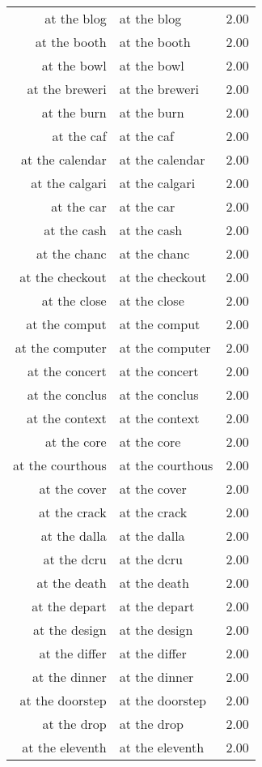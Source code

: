 \begin{table}[ht]
\begin{tabular}{rlr}
  at the blog & at the blog & 2.00 \\ 
  at the booth & at the booth & 2.00 \\ 
  at the bowl & at the bowl & 2.00 \\ 
  at the breweri & at the breweri & 2.00 \\ 
  at the burn & at the burn & 2.00 \\ 
  at the caf & at the caf & 2.00 \\ 
  at the calendar & at the calendar & 2.00 \\ 
  at the calgari & at the calgari & 2.00 \\ 
  at the car & at the car & 2.00 \\ 
  at the cash & at the cash & 2.00 \\ 
  at the chanc & at the chanc & 2.00 \\ 
  at the checkout & at the checkout & 2.00 \\ 
  at the close & at the close & 2.00 \\ 
  at the comput & at the comput & 2.00 \\ 
  at the computer & at the computer & 2.00 \\ 
  at the concert & at the concert & 2.00 \\ 
  at the conclus & at the conclus & 2.00 \\ 
  at the context & at the context & 2.00 \\ 
  at the core & at the core & 2.00 \\ 
  at the courthous & at the courthous & 2.00 \\ 
  at the cover & at the cover & 2.00 \\ 
  at the crack & at the crack & 2.00 \\ 
  at the dalla & at the dalla & 2.00 \\ 
  at the dcru & at the dcru & 2.00 \\ 
  at the death & at the death & 2.00 \\ 
  at the depart & at the depart & 2.00 \\ 
  at the design & at the design & 2.00 \\ 
  at the differ & at the differ & 2.00 \\ 
  at the dinner & at the dinner & 2.00 \\ 
  at the doorstep & at the doorstep & 2.00 \\ 
  at the drop & at the drop & 2.00 \\ 
  at the eleventh & at the eleventh & 2.00 \\ 

\end{tabular}
\end{table}
